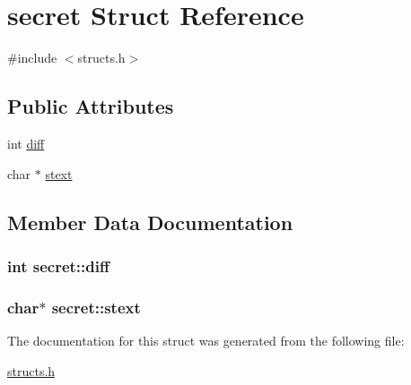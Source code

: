 \hypertarget{structsecret}{\section{secret Struct Reference}
\label{structsecret}
}


{\ttfamily \#include $<$structs.\-h$>$}

\subsection*{Public Attributes}
\begin{DoxyCompactItemize}
\item 
int \hyperlink{structsecret_aa40e4d7b2f1b1fd385efe3abc8b6724f}{diff}
\item 
char $\ast$ \hyperlink{structsecret_a13cce2403549ba2b368fa36c84d6ca87}{stext}
\end{DoxyCompactItemize}


\subsection{Member Data Documentation}
\hypertarget{structsecret_aa40e4d7b2f1b1fd385efe3abc8b6724f}{
\subsubsection[{diff}]{\setlength{\rightskip}{0pt plus 5cm}int secret\-::diff}}\label{structsecret_aa40e4d7b2f1b1fd385efe3abc8b6724f}
\hypertarget{structsecret_a13cce2403549ba2b368fa36c84d6ca87}{
\subsubsection[{stext}]{\setlength{\rightskip}{0pt plus 5cm}char$\ast$ secret\-::stext}}\label{structsecret_a13cce2403549ba2b368fa36c84d6ca87}


The documentation for this struct was generated from the following file\-:\begin{DoxyCompactItemize}
\item 
\hyperlink{structs_8h}{structs.\-h}\end{DoxyCompactItemize}
